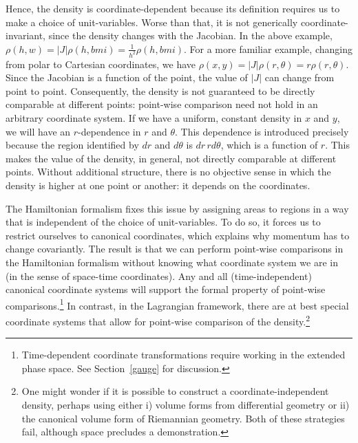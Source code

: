 \documentclass[12pt, english, twoside]{article} %
\begin{document}
Hence, the density is coordinate-dependent because its definition requires us to make a choice of unit-variables. Worse than that, it is not generically coordinate-invariant, since the density changes with the Jacobian. In the above example, $\rho(h,w) = |J| \rho(h, bmi) = \frac{1}{h^2} \rho(h, bmi)$. For a more familiar example, changing from polar to Cartesian coordinates, we have $\rho(x,y) = |J| \rho(r, \theta) = r \rho(r, \theta)$. Since the Jacobian is a function of the point, the value of $|J|$ can change from point to point. Consequently, the density is not guaranteed to be directly comparable at different points: point-wise comparison need not hold in an arbitrary coordinate system. If we have a uniform, constant density in $x$ and $y$, we will have an $r$-dependence in $r$ and $\theta$. This dependence is introduced precisely because the region identified by $dr$ and $d\theta$ is $dr \,r d\theta$, which is a function of $r$. This makes the value of the density, in general, not directly comparable at different points. Without additional structure, there is no objective sense in which the density is higher at one point or another: it depends on the coordinates.


The Hamiltonian formalism fixes this issue by assigning areas to regions in a way that is independent of the choice of unit-variables. To do so, it forces us to restrict ourselves to canonical coordinates, which explains why momentum has to change covariantly. The result is that we can perform point-wise comparisons in the Hamiltonian formalism without knowing what coordinate system we are in (in the sense of space-time coordinates). Any and all (time-independent) canonical coordinate systems will support the formal property of point-wise comparisons.\footnote{Time-dependent coordinate transformations require working in the extended phase space. See Section~\ref{gauge} for discussion.} In contrast, in the Lagrangian framework, there are at best special coordinate systems that allow for point-wise comparison of the density.\footnote{One might wonder if it is possible to construct a coordinate-independent density, perhaps using either i) volume forms from differential geometry or ii) the canonical volume form of Riemannian geometry. Both of these strategies fail, although space precludes a demonstration.}
\end{document}
